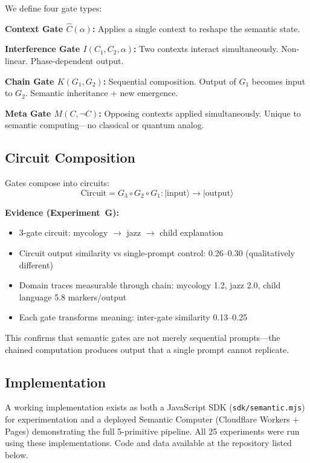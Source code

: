 \documentclass[11pt,a4paper]{article}
\newcommand{\ket}[1]{|#1\rangle}
\newcommand{\chat}{\hat{C}}
\begin{document}
We define four gate types:

\textbf{Context Gate $\chat(\alpha)$:} Applies a single context to reshape the semantic state.

\textbf{Interference Gate $I(C_1, C_2, \alpha)$:} Two contexts interact simultaneously. Non-linear. Phase-dependent output.

\textbf{Chain Gate $K(G_1, G_2)$:} Sequential composition. Output of $G_1$ becomes input to $G_2$. Semantic inheritance + new emergence.

\textbf{Meta Gate $M(C, \neg C)$:} Opposing contexts applied simultaneously. Unique to semantic computing---no classical or quantum analog.

\subsection{Circuit Composition}

Gates compose into circuits:
\begin{equation}
\text{Circuit} = G_3 \circ G_2 \circ G_1 : \ket{\text{input}} \to \ket{\text{output}}
\end{equation}

\textbf{Evidence (Experiment~G):}
\begin{itemize}
\item 3-gate circuit: mycology $\to$ jazz $\to$ child explanation
\item Circuit output similarity vs single-prompt control: 0.26--0.30 (qualitatively different)
\item Domain traces measurable through chain: mycology 1.2, jazz 2.0, child language 5.8 markers/output
\item Each gate transforms meaning: inter-gate similarity 0.13--0.25
\end{itemize}

This confirms that semantic gates are not merely sequential prompts---the chained computation produces output that a single prompt cannot replicate.

\subsection{Implementation}

A working implementation exists as both a JavaScript SDK (\texttt{sdk/semantic.mjs}) for experimentation and a deployed Semantic Computer (Cloudflare Workers + Pages) demonstrating the full 5-primitive pipeline. All 25 experiments were run using these implementations. Code and data available at the repository listed below.
\end{document}
